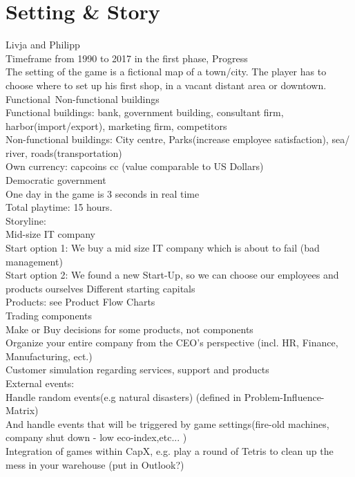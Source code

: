 \documentclass[11pt,titlepage,oneside,openany]{book}
\begin{document}
\section{Setting \& Story}
\label{SettingStory}
Livja and Philipp\\
Timeframe from 1990 to 2017 in the first phase, Progress\\
The setting of the game is a fictional map of a town/city.  The player has to choose where to set up his first shop, in a vacant distant area or downtown.\\
Functional\ Non-functional buildings\\
Functional buildings: bank, government building, consultant firm, harbor(import/export), marketing firm, competitors \\
Non-functional buildings: City centre, Parks(increase employee satisfaction), sea/ river, roads(transportation)\\
Own currency: capcoins cc (value comparable to US Dollars) \\
Democratic government \\
One day in the game is 3 seconds in real time\\
Total playtime: 15 hours.\\
Storyline:\\
Mid-size IT company\\
Start option 1: We buy a mid size IT company which is about to fail 
(bad management)\\
Start option 2: We found a new Start-Up, so we can choose our employees and products ourselves
Different starting capitals\\
Products: see Product Flow Charts\\
Trading components\\
Make or Buy decisions for some products, not components\\
Organize your entire company from the CEO's perspective (incl. HR, Finance, Manufacturing, ect.)\\
Customer simulation regarding services, support and products \\
External events:\\
Handle random events(e.g natural disasters) (defined in Problem-Influence-Matrix)\\
And handle events that will be triggered by game settings(fire-old machines, company shut down - low eco-index,etc... )\\
Integration of games within CapX, e.g. play a round of Tetris to clean up the mess  in your warehouse (put in Outlook?)\\
\end{document}
